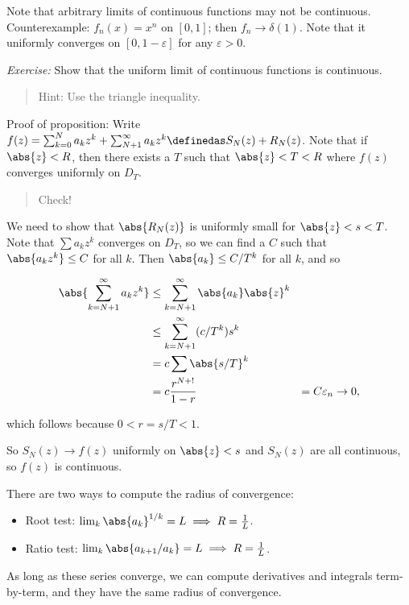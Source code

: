 Note that arbitrary limits of continuous functions may not be
continuous. Counterexample: \(f_n(x) = x^n\) on \([0, 1]\); then
\(f_n \to \delta(1)\). Note that it uniformly converges on
\([0, 1-\varepsilon]\) for any \(\varepsilon > 0\).

\emph{Exercise:} Show that the uniform limit of continuous functions is
continuous.

\begin{quote}
Hint: Use the triangle inequality.
\end{quote}

Proof of proposition: Write
\(f(z) = \sum_{k=0}^N a_k z^k + \sum_{N+1}^\infty a_k z^k \definedas S_N(z) + R_N(z)\).
Note that if \(\abs{z} < R\), then there exists a \(T\) such that
\(\abs{z} < T < R\) where \(f(z)\) converges uniformly on \(D_T\).

\begin{quote}
Check!
\end{quote}

We need to show that \(\abs{R_N(z)}\) is uniformly small for
\(\abs{z} < s < T\). Note that \(\sum a_k z^k\) converges on \(D_T\), so
we can find a \(C\) such that \(\abs{a_k z^k} \leq C\) for all \(k\).
Then \(\abs{a_k} \leq C/T^k\) for all \(k\), and so

\begin{align*}
\abs{\sum_{k=N+1}^\infty a_k z^k}
&\leq \sum_{k=N+1}^\infty \abs{a_k} \abs{z}^k \\
&\leq \sum_{k=N+1}^\infty  (c/T^k) s^k \\
&= c\sum \abs{s/T}^k \\
&= c \frac{r^{N+!}}{1-r}
&= C \varepsilon_n \to 0
,\end{align*}

which follows because \(0 < r = s/T < 1\).

So \(S_N(z) \to f(z)\) uniformly on \(\abs{z} < s\) and \(S_N(z)\) are
all continuous, so \(f(z)\) is continuous.

There are two ways to compute the radius of convergence:

\begin{itemize}
\tightlist
\item
  Root test: \(\lim_k \abs{a_k}^{1/k} = L \implies R = \frac 1 L\).
\item
  Ratio test: \(\lim_k \abs{a_{k+1} / a_k} = L \implies R = \frac 1 L\).
\end{itemize}

As long as these series converge, we can compute derivatives and
integrals term-by-term, and they have the same radius of convergence.

